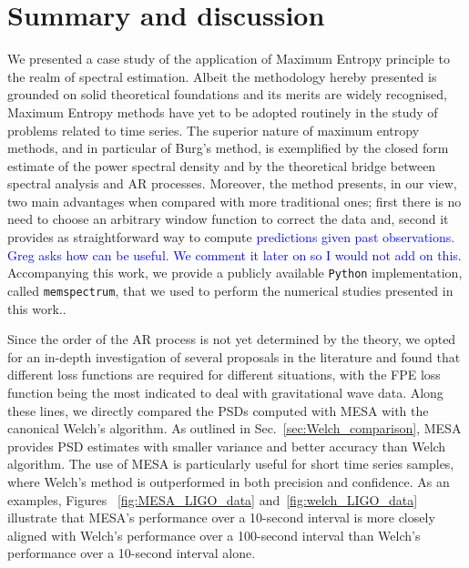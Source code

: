 \documentclass{aa}
\begin{document}
\section{Summary and discussion} \label{sec:conclusion}

We presented a case study of the application of Maximum Entropy principle to the realm of spectral estimation. Albeit the methodology hereby presented is grounded on solid theoretical foundations and its merits are widely recognised, Maximum Entropy methods have yet to be adopted routinely in the study of problems related to time series. The superior nature of maximum entropy methods, and in particular of Burg's method, is exemplified by the closed form estimate of the power spectral density and by the theoretical bridge between spectral analysis and AR processes. Moreover, the method presents, in our view, two main advantages when compared with more traditional ones; first there is no need to choose an arbitrary window function to correct the data and, second it provides as straightforward way to compute \textcolor{blue}{predictions given past observations. Greg asks how can be useful. We comment it later on so I would not add on this}. Accompanying this work, we provide a publicly available \texttt{Python} implementation, called \texttt{memspectrum}, that we used to perform the numerical studies presented in this work.. 

Since the order of the AR process is not yet determined by the theory, we opted for an in-depth investigation of several proposals in the literature and found that different loss functions are required for different situations, with the FPE loss function being the most indicated to deal with gravitational wave data. Along these lines, we directly compared the PSDs computed with MESA with the canonical Welch's algorithm. As outlined in Sec.~\ref{sec:Welch_comparison}, MESA provides PSD estimates with smaller variance and better accuracy than Welch algorithm.
The use of MESA is particularly useful for short time series samples, where Welch's method is outperformed in both precision and confidence. As an examples, Figures ~\ref{fig:MESA_LIGO_data} and~\ref{fig:welch_LIGO_data} illustrate that MESA's performance over a 10-second interval is more closely aligned with Welch's performance over a 100-second interval than Welch's performance over a 10-second interval alone. 
\end{document}
